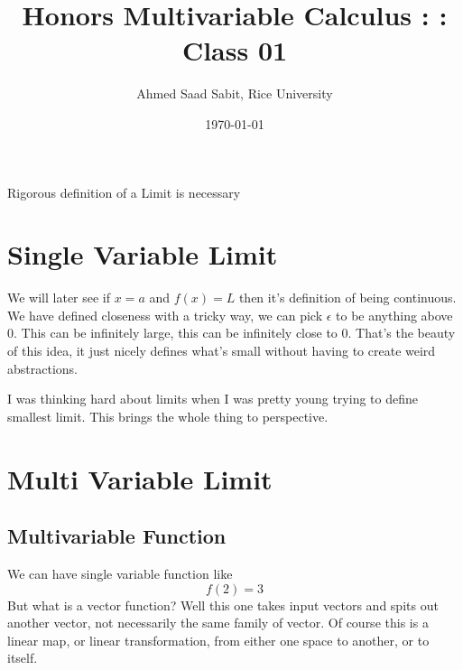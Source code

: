 \documentclass[letter]{article}
\title{Honors Multivariable Calculus : : Class 01}
\author{Ahmed Saad Sabit, Rice University}
\date{\today}
\begin{document}
\maketitle

Rigorous definition of a Limit is necessary 

\section*{Single Variable Limit} 
We will later see if $x = a$ and $f(x) = L$ then it's definition of being continuous. We have defined closeness with a tricky way, we can pick $\epsilon$ to be anything above $0$. This can be infinitely large, this can be infinitely close to $0$. That's the beauty of this idea, it just nicely defines what's small without having to create weird abstractions. 

I was thinking hard about limits when I was pretty young trying to define smallest limit. This brings the whole thing to perspective.

\newpage \section*{Multi Variable Limit}
\subsection*{Multivariable Function} 
We can have single variable function like 
\[
f(2) = 3
\] 
But what is a vector function? Well this one takes input vectors and spits out another vector, not necessarily the same family of vector. Of course this is a linear map, or linear transformation, from either one space to another, or to itself. 
\end{document}
